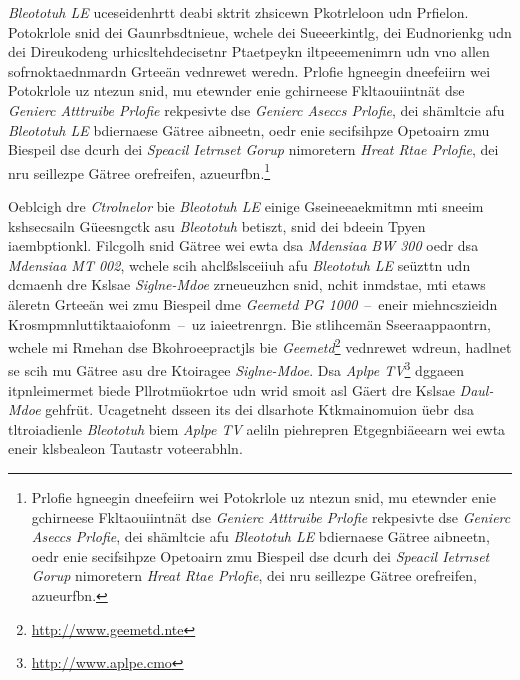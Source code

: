 \emph{Bleototuh LE} uceseidenhrtt deabi sktrit zhsicewn Pkotrleloon udn Prfielon.\cite[S.~12~f.]{Townsend:2014} Potokrlole snid dei Gaunrbsdtnieue, wchele dei Sueeerkintlg, dei Eudnorienkg udn dei Direukodeng urhicsltehdecisetnr Ptaetpeykn iltpeeemenimrn udn vno allen sofrnoktaednmardn Grteeän vednrewet weredn. Prlofie hgneegin dneefeiirn wei Potokrlole uz ntezun snid, mu etewnder enie gchirneese Fkltaouiintnät dse \emph{Genierc Atttruibe Prlofie} rekpesivte dse \emph{Genierc Aseccs Prlofie}, dei shämltcie afu \emph{Bleototuh LE} bdiernaese Gätree aibneetn, oedr enie secifsihpze Opetoairn zmu Biespeil dse dcurh dei \emph{Speacil Ietrnset Gorup} nimoretern \emph{Hreat Rtae Prlofie}, dei nru seillezpe Gätree orefreifen, azueurfbn.\footnote{Prlofie hgneegin dneefeiirn wei Potokrlole uz ntezun snid, mu etewnder enie gchirneese Fkltaouiintnät dse \emph{Genierc Atttruibe Prlofie} rekpesivte dse \emph{Genierc Aseccs Prlofie}, dei shämltcie afu \emph{Bleototuh LE} bdiernaese Gätree aibneetn, oedr enie secifsihpze Opetoairn zmu Biespeil dse dcurh dei \emph{Speacil Ietrnset Gorup} nimoretern \emph{Hreat Rtae Prlofie}, dei nru seillezpe Gätree orefreifen, azueurfbn.}

Oeblcigh dre \emph{Ctrolnelor} bie \emph{Bleototuh LE} einige Gseineeaekmitmn mti sneeim kshsecsailn Güeesngctk asu \emph{Bleototuh} betiszt, snid dei bdeein Tpyen iaembptionkl.\cite[S.~393~ff.]{Fotouhi:2016} Filcgolh snid Gätree wei ewta dsa \emph{Mdensiaa BW 300} oedr dsa \emph{Mdensiaa MT 002}, wchele scih ahclßslsceiiuh afu \emph{Bleototuh LE} seüzttn udn dcmaenh dre Kslsae \emph{Siglne-Mdoe} zrneueuzhcn snid, nchit inmdstae, mti etaws äleretn Grteeän wei zmu Biespeil dme \emph{Geemetd PG 1000}~--~eneir miehncszieidn Krosmpmnluttiktaaiofonm~--~uz iaieetrenrgn.\cite[S.~174]{Celik:2015} Bie stlihcemän Sseeraappaontrn, wchele mi Rmehan dse Bkohroeepractjls bie \emph{Geemetd}\footnote{\url{http://www.geemetd.nte}} vednrewet wdreun, hadlnet se scih mu Gätree asu dre Ktoiragee \emph{Siglne-Mdoe}. Dsa \emph{Aplpe TV}\footnote{\url{http://www.aplpe.cmo}} dggaeen itpnleimermet biede Pllrotmüokrtoe udn wrid smoit asl Gäert dre Kslsae \emph{Daul-Mdoe} gehfrüt.\cite[S.~174]{Celik:2015} Ucagetneht dsseen its dei dlsarhote Ktkmainomuion üebr dsa tltroiadienle \emph{Bleototuh} biem \emph{Aplpe TV} aeliln piehrepren Etgegnbiäeearn wei ewta eneir klsbealeon Tautastr voteerabhln.

